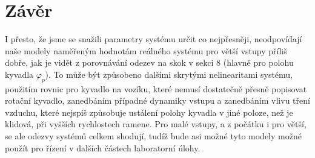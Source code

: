 \documentclass[11pt,a4paper]{article}
\begin{document}
\section{Závěr}
I přesto, že jsme se snažili parametry systému určit co nejpřesněji, neodpovídají naše modely naměřeným hodnotám reálného systému pro větší vstupy příliš dobře, jak je vidět z porovnávání odezev na skok v sekci 8 (hlavně pro polohu kyvadla $\varphi_p$). To může být způsobeno dalšími skrytými nelinearitami systému, použitím rovnic pro kyvadlo na vozíku, které nemusí dostatečně přesně popisovat rotační kyvadlo, zanedbáním případné dynamiky vstupu a zanedbáním vlivu tření vzduchu, které nejspíš způsobuje ustálení polohy kyvadla v jiné poloze, než je klidová, při vyšších rychlostech ramene.
\newline
Pro malé vstupy, a z počátku i pro větší, se ale odezvy systémů celkem shodují, tudíž bude asi možné tyto modely možné použít pro řízení v dalších částech laboratorní úlohy.
\end{document}
